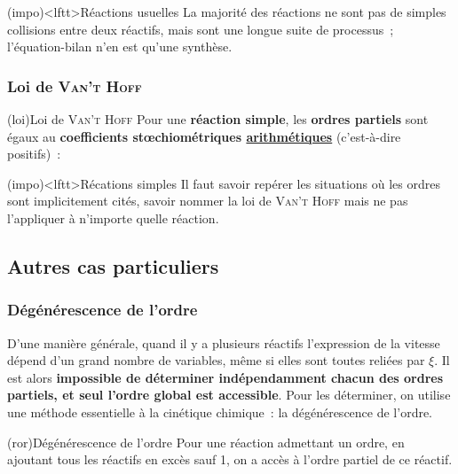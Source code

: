 \documentclass[../../main/main.tex]{subfiles}
\begin{document}
\begin{tcb}(impo)<lftt>{Réactions usuelles}
	La majorité des réactions ne sont pas de simples collisions
	entre deux réactifs, mais sont une longue suite de processus~; l'équation-bilan
	n'en est qu'une synthèse.
\end{tcb}

\subsubsection{Loi de \textsc{Van't Hoff}}
\begin{tcb*}[label=loi:vanthoff](loi){Loi de \textsc{Van't Hoff}}
	Pour une \textbf{réaction simple}, les \textbf{ordres partiels} sont égaux
	au \textbf{coefficients stœchiométriques \underline{arithmétiques}}
	(c'est-à-dire positifs)~:
	\psw{%
		\[
			\boxed{v = k[{\ce{A}}]^{\left| \nu_{\ce{A}} \right|}
					[{\ce{B}}]^{\left| \nu_{\ce{B}} \right|}}
			\Lra
			\boxed{v = k\prod_{i}[{\ce{R}}_i]^{\left| \nu_i \right|}}
		\]
	}%
	\vspace{-15pt}
\end{tcb*}

\begin{tcb}(impo)<lftt>{Récations simples}
	Il faut savoir repérer les situations où les ordres sont implicitement cités,
	savoir nommer la loi de \textsc{Van't Hoff} mais ne pas l'appliquer à
	n'importe quelle réaction.
\end{tcb}

\subsection{Autres cas particuliers}
\subsubsection{Dégénérescence de l'ordre}
D'une manière générale, quand il y a plusieurs réactifs l'expression de la
vitesse dépend d'un grand nombre de variables, même si elles sont toutes reliées
par $\xi$. Il est alors \textbf{impossible de déterminer indépendamment chacun
	des ordres partiels, et seul l'ordre global est accessible}. Pour les
déterminer, on utilise une méthode essentielle à la cinétique chimique~: la
dégénérescence de l'ordre.

\begin{tcb}[label=prop:dege, bld, cnt](ror){Dégénérescence de l'ordre}
	Pour une réaction admettant un ordre, en ajoutant tous les réactifs en excès
	sauf 1, on a accès à l'ordre partiel de ce réactif.
\end{tcb}
\end{document}
